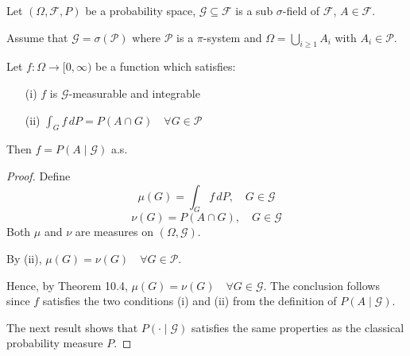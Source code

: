 \begin{theorem}
Let \((\Omega, \mathcal{F}, P)\) be a probability space, \(\mathcal{G} \subseteq \mathcal{F}\) is a sub \(\sigma\)-field of \(\mathcal{F}\), \(A \in \mathcal{F}\).

Assume that \(\mathcal{G} = \sigma(\mathcal{P})\) where \(\mathcal{P}\) is a \(\pi\)-system and \(\Omega = \bigcup_{i \geq 1} A_i\) with \(A_i \in \mathcal{P}\).

Let \(f: \Omega \rightarrow [0, \infty)\) be a function which satisfies:
\begin{itemize}
    \item[(i)] \(f\) is \(\mathcal{G}\)-measurable and integrable
    \item[(ii)] \(\int_G f \, dP = P(A \cap G) \quad \forall G \in \mathcal{P}\)
\end{itemize}

Then \(f = P(A \mid \mathcal{G})\) a.s.
\end{theorem}
\begin{proof}
Define
\[
\mu(G) = \int_G f \, dP, \quad G \in \mathcal{G}
\]
\[
\nu(G) = P(A \cap G), \quad G \in \mathcal{G}
\]
Both \(\mu\) and \(\nu\) are measures on \((\Omega, \mathcal{G})\).

By (ii), \(\mu(G) = \nu(G) \quad \forall G \in \mathcal{P}\).

Hence, by Theorem 10.4, \(\mu(G) = \nu(G) \quad \forall G \in \mathcal{G}\). The conclusion follows since \(f\) satisfies the two conditions (i) and (ii) from the definition of \(P(A \mid \mathcal{G})\).

The next result shows that \(P(\cdot \mid \mathcal{G})\) satisfies the same properties as the classical probability measure \(P\).
\end{proof}


